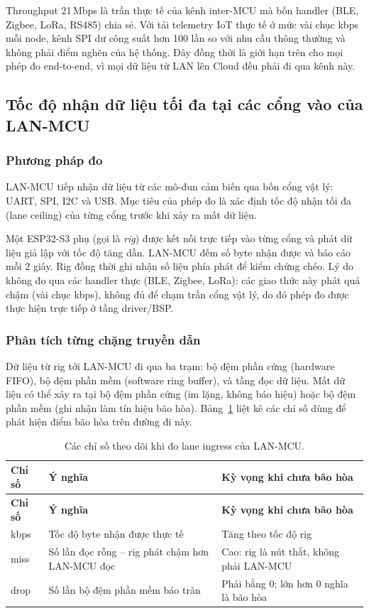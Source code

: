 Throughput 21\,Mbps là trần thực tế của kênh inter-MCU mà bốn handler (BLE, Zigbee, LoRa, RS485) chia sẻ. Với tải telemetry IoT thực tế ở mức vài chục kbps mỗi node, kênh SPI dư công suất hơn 100 lần so với nhu cầu thông thường và không phải điểm nghẽn của hệ thống. Đây đồng thời là giới hạn trên cho mọi phép đo end-to-end, vì mọi dữ liệu từ LAN lên Cloud đều phải đi qua kênh này.

\subsection{Tốc độ nhận dữ liệu tối đa tại các cổng vào của LAN-MCU}
\label{subsec:bench_lan_ingress}

\subsubsection{Phương pháp đo}

LAN-MCU tiếp nhận dữ liệu từ các mô-đun cảm biến qua bốn cổng vật lý: UART, SPI, I2C và USB. Mục tiêu của phép đo là xác định tốc độ nhận tối đa (lane ceiling) của từng cổng trước khi xảy ra mất dữ liệu.

Một ESP32-S3 phụ (gọi là \textit{rig}) được kết nối trực tiếp vào từng cổng và phát dữ liệu giả lập với tốc độ tăng dần. LAN-MCU đếm số byte nhận được và báo cáo mỗi 2 giây. Rig đồng thời ghi nhận số liệu phía phát để kiểm chứng chéo. Lý do không đo qua các handler thực (BLE, Zigbee, LoRa): các giao thức này phát quá chậm (vài chục kbps), không đủ để chạm trần cổng vật lý, do đó phép đo được thực hiện trực tiếp ở tầng driver/BSP.

\subsubsection{Phân tích từng chặng truyền dẫn}

Dữ liệu từ rig tới LAN-MCU đi qua ba trạm: bộ đệm phần cứng (hardware FIFO), bộ đệm phần mềm (software ring buffer), và tầng đọc dữ liệu. Mất dữ liệu có thể xảy ra tại bộ đệm phần cứng (im lặng, không báo hiệu) hoặc bộ đệm phần mềm (ghi nhận làm tín hiệu bão hòa). Bảng~\ref{tab:lan_metrics} liệt kê các chỉ số dùng để phát hiện điểm bão hòa trên đường đi này.

\begin{longtable}{|p{2cm}|p{6cm}|p{5.5cm}|}
    \caption{Các chỉ số theo dõi khi đo lane ingress của LAN-MCU.}
    \label{tab:lan_metrics} \\
    \hline
    \textbf{Chỉ số} & \textbf{Ý nghĩa} & \textbf{Kỳ vọng khi chưa bão hòa} \\ \hline
    \endfirsthead
    \hline
    \textbf{Chỉ số} & \textbf{Ý nghĩa} & \textbf{Kỳ vọng khi chưa bão hòa} \\ \hline
    \endhead
    \hline
    \endfoot
    \endlastfoot
    kbps & Tốc độ byte nhận được thực tế & Tăng theo tốc độ rig \\ \hline
    miss & Số lần đọc rỗng -- rig phát chậm hơn LAN-MCU đọc & Cao: rig là nút thắt, không phải LAN-MCU \\ \hline
    drop & Số lần bộ đệm phần mềm báo tràn & Phải bằng 0; lớn hơn 0 nghĩa là bão hòa \\ \hline
\end{longtable}

